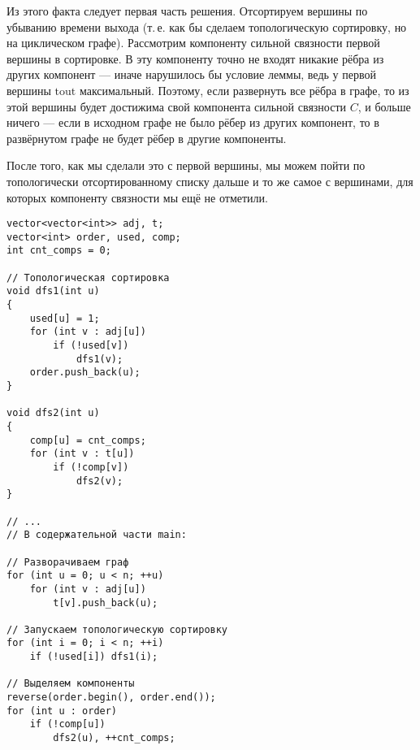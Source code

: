 Из этого факта следует первая часть решения. Отсортируем вершины по убыванию времени выхода (т.\,е. как бы сделаем топологическую сортировку, но на циклическом графе). Рассмотрим компоненту сильной связности первой вершины в сортировке. В эту компоненту точно не входят никакие рёбра из других компонент --- иначе нарушилось бы условие леммы, ведь у первой вершины $\mathrm{tout}$ максимальный. Поэтому, если развернуть все рёбра в графе, то из этой вершины будет достижима свой компонента сильной связности $C$, и больше ничего --- если в исходном графе не было рёбер из других компонент, то в развёрнутом графе не будет рёбер в другие компоненты.

После того, как мы сделали это с первой вершины, мы можем пойти по топологически отсортированному списку дальше и то же самое с вершинами, для которых компоненту связности мы ещё не отметили.

\begin{verbatim}
vector<vector<int>> adj, t;
vector<int> order, used, comp;
int cnt_comps = 0;

// Топологическая сортировка
void dfs1(int u)
{
    used[u] = 1;
    for (int v : adj[u])
        if (!used[v])
            dfs1(v);
    order.push_back(u);
}

void dfs2(int u)
{
    comp[u] = cnt_comps;
    for (int v : t[u])
        if (!comp[v])
            dfs2(v);
}

// ... 
// В содержательной части main:

// Разворачиваем граф
for (int u = 0; u < n; ++u)
    for (int v : adj[u])
        t[v].push_back(u);

// Запускаем топологическую сортировку
for (int i = 0; i < n; ++i)
    if (!used[i]) dfs1(i);

// Выделяем компоненты
reverse(order.begin(), order.end());
for (int u : order)
    if (!comp[u])
        dfs2(u), ++cnt_comps;
\end{verbatim}

